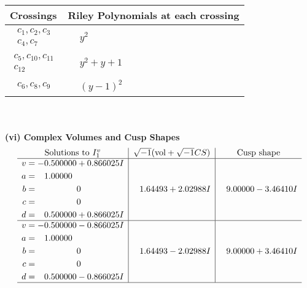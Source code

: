\documentclass[1p]{elsarticle_modified}
\theoremstyle{definition}
\newcommand{\I}{\sqrt{-1}}
\begin{document}
\begin{tabular}{m{50pt}|m{274pt}}
Crossings & \hspace{64pt}Riley Polynomials at each crossing \\
\hline $$\begin{aligned}c_{1},c_{2},c_{3}\\c_{4},c_{7}\end{aligned}$$&$\begin{aligned}
&y^2
\end{aligned}$\\
\hline $$\begin{aligned}c_{5},c_{10},c_{11}\\c_{12}\end{aligned}$$&$\begin{aligned}
&y^2+y+1
\end{aligned}$\\
\hline $$\begin{aligned}c_{6},c_{8},c_{9}\end{aligned}$$&$\begin{aligned}
&(y-1)^2
\end{aligned}$\\
\hline
\end{tabular}\\~\\
\newpage\flushleft \textbf{(vi) Complex Volumes and Cusp Shapes}
$$\begin{array}{c|c|c}  
\text{Solutions to }I^v_{1}& \I (\text{vol} + \sqrt{-1}CS) & \text{Cusp shape}\\
 \hline 
\begin{aligned}
v &= -0.500000 + 0.866025 I \\
a &= \phantom{-}1.00000\phantom{ +0.000000I} \\
b &= \phantom{-0.000000 } 0 \\
c &= \phantom{-0.000000 } 0 \\
d &= \phantom{-}0.500000 + 0.866025 I\end{aligned}
 & \phantom{-}1.64493 + 2.02988 I & \phantom{-}9.00000 - 3.46410 I \\ \hline\begin{aligned}
v &= -0.500000 - 0.866025 I \\
a &= \phantom{-}1.00000\phantom{ +0.000000I} \\
b &= \phantom{-0.000000 } 0 \\
c &= \phantom{-0.000000 } 0 \\
d &= \phantom{-}0.500000 - 0.866025 I\end{aligned}
 & \phantom{-}1.64493 - 2.02988 I & \phantom{-}9.00000 + 3.46410 I\\
 \hline 
 \end{array}$$\newpage\newpage\renewcommand{\arraystretch}{1}
\end{document}
